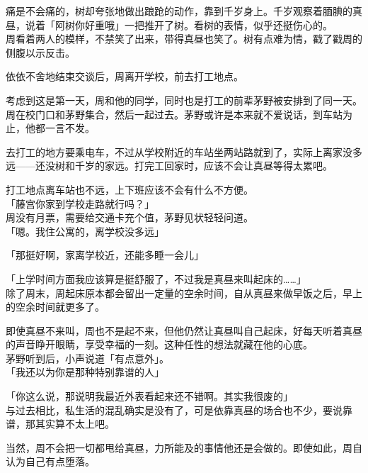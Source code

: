 痛是不会痛的，树却夸张地做出踉跄的动作，靠到千岁身上。千岁观察着腼腆的真昼，说着「阿树你好重哦」一把推开了树。看树的表情，似乎还挺伤心的。\\

周看着两人的模样，不禁笑了出来，带得真昼也笑了。树有点难为情，戳了戳周的侧腹以示反击。\\

\vspace{2\baselineskip}

依依不舍地结束交谈后，周离开学校，前去打工地点。

考虑到这是第一天，周和他的同学，同时也是打工的前辈茅野被安排到了同一天。\\

周在校门口和茅野集合，然后一起过去。茅野或许是本来就不爱说话，到车站为止，他都一言不发。

去打工的地方要乘电车，不过从学校附近的车站坐两站路就到了，实际上离家没多远——还没树和千岁的家远。打完工回家时，应该不会让真昼等得太累吧。

打工地点离车站也不远，上下班应该不会有什么不方便。\\

「藤宫你家到学校走路就行吗？」\\

周没有月票，需要给交通卡充个值，茅野见状轻轻问道。\\

「嗯。我住公寓的，离学校没多远」

「那挺好啊，家离学校近，还能多睡一会儿」

「上学时间方面我应该算是挺舒服了，不过我是真昼来叫起床的……」\\

除了周末，周起床原本都会留出一定量的空余时间，自从真昼来做早饭之后，早上的空余时间就更多了。

即使真昼不来叫，周也不是起不来，但他仍然让真昼叫自己起床，好每天听着真昼的声音睁开眼睛，享受幸福的一刻。这种任性的想法就藏在他的心底。\\

茅野听到后，小声说道「有点意外」。\\

「我还以为你是那种特别靠谱的人」

「你这么说，那说明我最近外表看起来还不错啊。其实我很废的」\\

与过去相比，私生活的混乱确实是没有了，可是依靠真昼的场合也不少，要说靠谱，那其实算不太上吧。

当然，周不会把一切都甩给真昼，力所能及的事情他还是会做的。即使如此，周自认为自己有点堕落。\\

